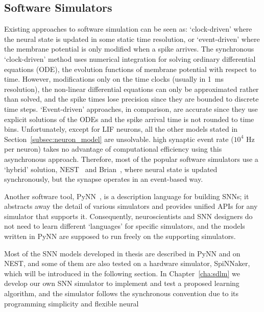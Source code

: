 \subsection{Software Simulators}
Existing approaches to software simulation can be seen as: `clock-driven' where the neural state is updated in some static time resolution, or `event-driven' where the membrane potential is only modified when a spike arrives.
The synchronous `clock-driven' method uses numerical integration for solving ordinary differential equations (ODE), the evolution functions of membrane potential with respect to time.
However, modifications only on the time clocks (usually in 1~ms resolution), the non-linear differential equations can only be approximated rather than solved, and the spike times lose precision since they are bounded to discrete time steps.
`Event-driven' approaches, in comparison, are accurate since they use explicit solutions of the ODEs and the spike arrival time is not rounded to time bins.
Unfortunately, except for LIF neurons, all the other models stated in Section~\ref{subsec:neuron_model} are \protect{} unsolvable.
\protect{}
\protect{} high synaptic event rate ($10^4$ Hz per neuron) takes no advantage of computational efficiency using this asynchronous approach.
Therefore, most of the popular software simulators use a `hybrid' solution, \protect{} \protect{} NEST~\citep{gewaltig2007nest} and Brian~\citep{goodman2008brian}, where 
neural state is updated synchronously, but the synapse operates in an event-based way.

Another software tool, PyNN~\citep{davison2008pynn}, is a description language for building SNNs;
it abstracts away the detail of various simulators and provides unified APIs for any simulator that supports it.
Consequently, neuroscientists and SNN designers do not need to learn different `languages' for specific simulators, and the models written in PyNN are supposed to run freely on the supporting simulators.

Most of the SNN models developed in \protect{} \protect{} thesis are described in PyNN and \protect{} \protect{} on NEST, and some of them are also tested on a hardware simulator, SpiNNaker, which will be introduced in the following section.
In Chapter~\ref{cha:sdlm} we develop our own SNN simulator to implement and test a proposed learning algorithm, and the simulator follows the synchronous convention due to its programming simplicity and flexible neural \protect{} \protect{} 

